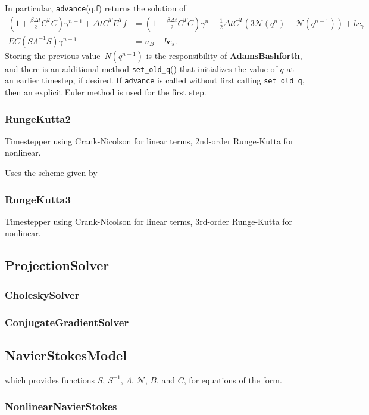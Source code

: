 \documentclass[11pt]{article}
\def\class#1{{\bf #1}} %
\def\fn#1{{\tt #1}} %
\begin{document}
In particular, \fn{advance}(q,f) returns the solution of
	\begin{align}
		\left(1+\frac{\beta\Delta t}{2}C^TC\right)\gamma^{n+1} + \Delta t C^TE^Tf &= \left(1 - \frac{\beta\Delta t}{2}C^TC\right)\gamma^n + \frac{1}{2}\Delta t C^T (3\mathcal{N}(q^n)-\mathcal{N}(q^{n-1})) + bc_\gamma \\
		EC(S\Lambda^{-1}S)\gamma^{n+1} &= u_B - bc_s.
	\end{align}
Storing the previous value~$N(q^{n-1})$ is the responsibility of \class{AdamsBashforth}, and there is an additional method \fn{set\_old\_q}() that initializes the value of $q$ at an earlier timestep, if desired.  If \fn{advance} is called without first calling \fn{set\_old\_q}, then an explicit Euler method is used for the first step.

\subsubsection{RungeKutta2}
Timestepper using Crank-Nicolson for linear terms, 2nd-order Runge-Kutta for nonlinear.

Uses the scheme given by\cite{Peyret}

\subsubsection{RungeKutta3}
Timestepper using Crank-Nicolson for linear terms, 3rd-order Runge-Kutta for nonlinear.

\subsection{ProjectionSolver}

\subsubsection{CholeskySolver}
\subsubsection{ConjugateGradientSolver}

\subsection{NavierStokesModel}
which provides functions 
$S$, $S^{-1}$, $\Lambda$, $\mathcal{N}$, $B$, and $C$, for equations of the form.
\subsubsection{NonlinearNavierStokes}
\end{document}
